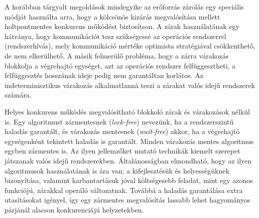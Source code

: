     A korábban tárgyalt megoldások mindegyike az erőforrás zárolás egy speciális módját használta arra, hogy a kölcsönös kizárás megvalósítása mellett holtpontmentes konkurens működést biztosítson. A zárak használatának egy hátránya, hogy kommunikációt tesz szükségessé az operációs rendszerrel (rendszerhívás), mely kommunikáció mértéke optimista stratégiával csökkenthető, de nem elkerülhető. A másik felmerülő probléma, hogy a zárra várakozás blokkolja a végrehajtó egységet, azt az operációs rendszer felfüggesztheti, a felfüggesztés hosszának ideje pedig nem garantáltan korlátos. Az indeterminisztikus várakozás alkalmatlanná teszi a zárakat valós idejű rendszerek számára.
    
    Helyes konkurens működés megvalósítható blokkoló zárak és várakozások nélkül is. Egy algoritmust zármentesnek (\emph{lock-free}) nevezünk, ha a rendszerszintű haladás garantált, és várakozás mentesnek (\emph{wait-free}) akkor, ha a végrehajtó egységenként tekintett haladás is garantált. Minden várakozás mentes algoritmus egyben zármentes is. Az ilyen jellemzőket mutató technikák kiemelt szerepet játszanak valós idejű rendszerekben. Általánosságban elmondható, hogy az ilyen algoritmusok használatának is ára van; a kifejlesztésük és helyességüknek bizonyítása, valamint karbantartásuk jóval költségesebb feladat, mint egy azonos funkciójú, zárakkal operáló változatnak. Továbbá a haladás garantálása extra utasításokat igényel, így egy zármentes megvalósítás lassabb lehet hagyományos párjánál alacson konkurenciájú helyzetekben.
    
